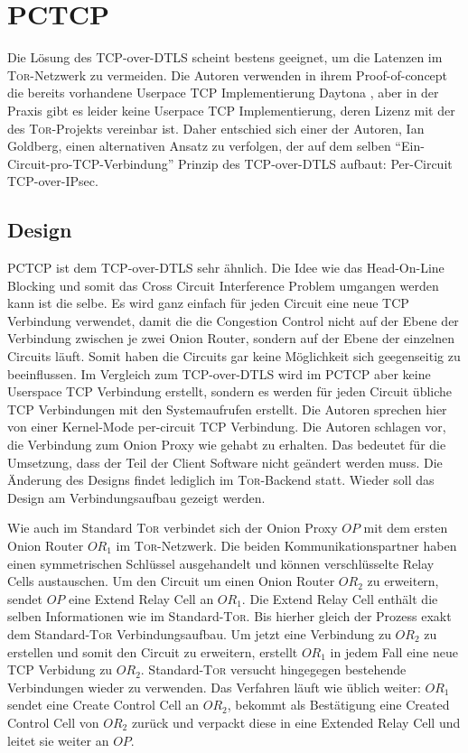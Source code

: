 \documentclass[fleqn,envcountsame,runningheads,10pt,a4paper]{llncs}
\begin{document}
\section{PCTCP}
\label{sec:pctcp}

Die Lösung des TCP-over-DTLS scheint bestens geeignet, um die Latenzen im \textsc{Tor}-Netzwerk zu vermeiden. Die Autoren verwenden in ihrem Proof-of-concept die bereits vorhandene Userpace TCP Implementierung Daytona \cite{daytona}, aber in der Praxis gibt es leider keine Userpace TCP  Implementierung, deren Lizenz mit der des \textsc{Tor}-Projekts vereinbar ist. Daher entschied sich einer der Autoren, Ian Goldberg, einen alternativen Ansatz zu verfolgen, der auf dem selben ``Ein-Circuit-pro-TCP-Verbindung'' Prinzip des  TCP-over-DTLS aufbaut: Per-Circuit TCP-over-IPsec. 

\subsection{Design}

PCTCP ist dem TCP-over-DTLS sehr ähnlich. Die Idee wie das Head-On-Line Blocking und somit das Cross Circuit Interference Problem umgangen werden kann ist die selbe. Es wird ganz einfach für jeden Circuit eine neue TCP Verbindung verwendet, damit die die Congestion Control nicht auf der Ebene der Verbindung zwischen je zwei Onion Router, sondern auf der Ebene der einzelnen Circuits läuft. Somit haben die Circuits gar keine Möglichkeit sich geegenseitig zu beeinflussen. Im Vergleich zum TCP-over-DTLS wird im PCTCP aber keine Userspace TCP Verbindung erstellt, sondern es werden für jeden Circuit übliche TCP Verbindungen mit den Systemaufrufen erstellt. Die Autoren sprechen hier von einer Kernel-Mode per-circuit TCP Verbindung. 
Die Autoren schlagen vor, die Verbindung zum Onion Proxy wie gehabt zu erhalten. Das bedeutet für die Umsetzung, dass der Teil der Client Software nicht geändert werden muss. Die Änderung des Designs findet lediglich im \textsc{Tor}-Backend statt. Wieder soll das Design am Verbindungsaufbau gezeigt werden.

Wie auch im Standard \textsc{Tor} verbindet sich der Onion Proxy $\textit{OP}$ mit dem ersten Onion Router $\textit{OR}_1$ im \textsc{Tor}-Netzwerk. Die beiden Kommunikationspartner haben einen symmetrischen Schlüssel ausgehandelt und können verschlüsselte Relay Cells austauschen. Um den Circuit um einen Onion Router $\textit{OR}_2$ zu erweitern, sendet $\textit{OP}$ eine Extend Relay Cell an $\textit{OR}_1$. Die Extend Relay Cell enthält die selben Informationen wie im Standard-\textsc{Tor}. Bis hierher gleich der Prozess exakt dem Standard-\textsc{Tor} Verbindungsaufbau. Um jetzt eine Verbindung zu $\textit{OR}_2$ zu erstellen und somit den Circuit zu erweitern, erstellt $\textit{OR}_1$ in jedem Fall eine neue TCP Verbidung zu $\textit{OR}_2$. Standard-\textsc{Tor} versucht hingegegen bestehende Verbindungen wieder zu verwenden. Das Verfahren läuft wie üblich weiter: $\textit{OR}_1$ sendet eine Create Control Cell an $\textit{OR}_2$, bekommt als Bestätigung eine Created Control Cell von $\textit{OR}_2$ zurück und verpackt diese in eine Extended Relay Cell und leitet sie weiter an $\textit{OP}$.
\end{document}
